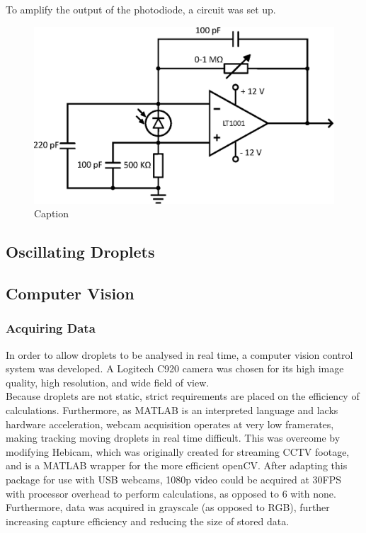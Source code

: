 \documentclass{physics_article_B}
\begin{document}
    To amplify the output of the photodiode, a circuit was set up.
    
    \begin{figure}
        \centering
        \includegraphics[scale=0.8]{Figures/PDCircuit.eps}
        \caption{Caption}
        \label{fig:my_label}
    \end{figure}
    
    \subsection{Oscillating Droplets}
        
    \subsection{Computer Vision\label{sect_vision}}
        
        \subsubsection{Acquiring Data}
            In order to allow droplets to be analysed in real time, a computer vision control system was developed. A Logitech C920 camera was chosen for its high image quality, high resolution, and wide field of view. \\
            
            Because droplets are not static, strict requirements are placed on the efficiency of calculations. Furthermore, as MATLAB is an interpreted language and lacks hardware acceleration, webcam acquisition operates at very low framerates, making tracking moving droplets in real time difficult. This was overcome by modifying Hebicam\cite{HebiCam}, which was originally created for streaming CCTV footage, and is a MATLAB wrapper for the more efficient openCV. After adapting this package for use with USB webcams, 1080p video could be acquired at 30FPS with processor overhead to perform calculations, as opposed to 6 with none. Furthermore, data was acquired in grayscale (as opposed to RGB), further increasing capture efficiency and reducing the size of stored data. 
            
\end{document}
